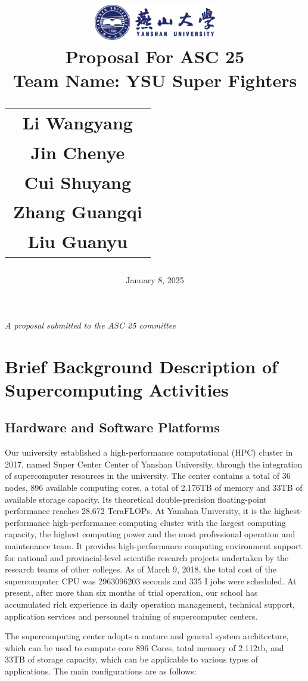 \documentclass[a4paper,12pt]{article}
\title{
    \includegraphics[width=0.4\textwidth]{ysu-logo.png}\\[1cm] %
    {\LARGE Proposal For ASC 25}\\[0.5cm]
    \large Team Name: YSU Super Fighters\\[1cm] %
    \begin{tabular}{c}
        \large Li Wangyang \\
        \large Jin Chenye \\
        \large Cui Shuyang \\
        \large Zhang Guangqi \\
        \large Liu Guanyu
    \end{tabular}
}
\author{}
\date{\vfill January 8, 2025}
\begin{document}
\maketitle
\thispagestyle{empty}
\vfill
\begin{center}
    \textit{A proposal submitted to the ASC 25 committee}
\end{center}
\newpage

\tableofcontents
{}
\newpage

\section{Brief Background Description of Supercomputing Activities}

\subsection{Hardware and Software Platforms}

Our university established a high-performance computational (HPC) cluster in 2017, named Super Center Center of Yanshan University, through the integration of supercomputer resources in the university. The center contains a total of 36 nodes, 896 available computing cores, a total of 2.176TB of memory and 33TB of available storage capacity. Its theoretical double-precision floating-point performance reaches 28.672 TeraFLOPs. At Yanshan University, it is the highest-performance high-performance computing cluster with the largest computing capacity, the highest computing power and the most professional operation and maintenance team. It provides high-performance computing environment support for national and provincial-level scientific research projects undertaken by the research teams of other colleges. As of March 9, 2018, the total cost of the supercomputer CPU was 2963096203 seconds and 335 I jobs were scheduled. At present, after more than six months of trial operation, our school has accumulated rich experience in daily operation management, technical support, application services and personnel training of supercomputer centers.

The supercomputing center adopts a mature and general system architecture, which can be used to compute core 896 Cores, total memory of 2.112tb, and 33TB of storage capacity, which can be applicable to various types of applications. The main configurations are as follows:
\end{document}

